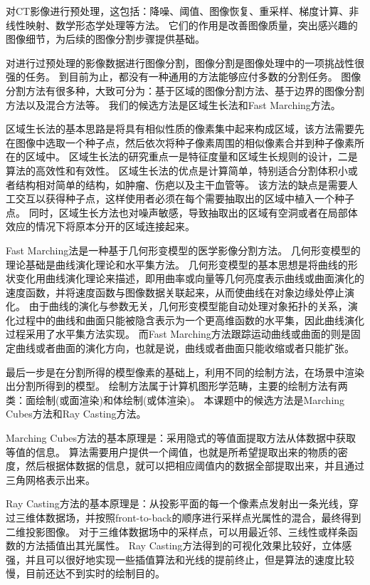 对CT影像进行预处理，这包括：降噪、阈值、图像恢复、重采样、梯度计算、非线性映射、数学形态学处理等方法。
它们的作用是改善图像质量，突出感兴趣的图像细节，为后续的图像分割步骤提供基础。

对进行过预处理的影像数据进行图像分割，图像分割是图像处理中的一项挑战性很强的任务。
到目前为止，都没有一种通用的方法能够应付多数的分割任务。
图像分割方法有很多种，大致可分为：基于区域的图像分割方法、基于边界的图像分割方法以及混合方法等。
我们的候选方法是区域生长法和Fast Marching方法。

区域生长法的基本思路是将具有相似性质的像素集中起来构成区域，该方法需要先在图像中选取一个种子点，然后依次将种子像素周围的相似像素合并到种子像素所在的区域中。
区域生长法的研究重点一是特征度量和区域生长规则的设计，二是算法的高效性和有效性。
区域生长法的优点是计算简单，特别适合分割体积小或者结构相对简单的结构，如肿瘤、伤疤以及主干血管等。
该方法的缺点是需要人工交互以获得种子点，这样使用者必须在每个需要抽取出的区域中植入一个种子点。
同时，区域生长方法也对噪声敏感，导致抽取出的区域有空洞或者在局部体效应的情况下将原本分开的区域连接起来。

Fast Marching法是一种基于几何形变模型的医学影像分割方法。
几何形变模型的理论基础是曲线演化理论和水平集方法。
几何形变模型的基本思想是将曲线的形状变化用曲线演化理论来描述，即用曲率或向量等几何亮度表示曲线或曲面演化的速度函数，并将速度函数与图像数据关联起来，从而使曲线在对象边缘处停止演化。
由于曲线的演化与参数无关，几何形变模型能自动处理对象拓扑的关系，演化过程中的曲线和曲面只能被隐含表示为一个更高维函数的水平集，因此曲线演化过程采用了水平集方法实现。
而Fast Marching方法跟踪运动曲线或曲面的则是固定曲线或者曲面的演化方向，也就是说，曲线或者曲面只能收缩或者只能扩张。

最后一步是在分割所得的模型像素的基础上，利用不同的绘制方法，在场景中渲染出分割所得到的模型。
绘制方法属于计算机图形学范畴，主要的绘制方法有两类：面绘制(或面渲染)和体绘制(或体渲染)。
本课题中的候选方法是Marching Cubes方法和Ray Casting方法。

Marching Cubes方法的基本原理是：采用隐式的等值面提取方法从体数据中获取等值的信息。
算法需要用户提供一个阈值，也就是所希望提取出来的物质的密度，然后根据体数据的信息，就可以把相应阈值内的数据全部提取出来，并且通过三角网格表示出来。

Ray Casting方法的基本原理是：从投影平面的每一个像素点发射出一条光线，穿过三维体数据场，并按照front-to-back的顺序进行采样点光属性的混合，最终得到二维投影图像。
对于三维体数据场中的采样点，可以用最近邻、三线性或样条函数的方法插值出其光属性。
Ray Casting方法得到的可视化效果比较好，立体感强，并且可以很好地实现一些插值算法和光线的提前终止，但是算法的速度比较慢，目前还达不到实时的绘制目的。

